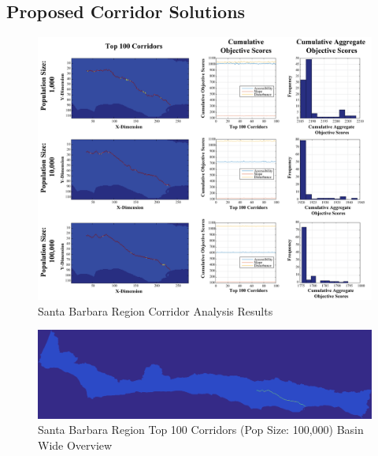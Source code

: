     \subsection{Proposed Corridor Solutions}
    
        \begin{figure}[!h]
            \begin{center}
            \includegraphics[width=6in]{figures/SantaBarbara_PathwayResults.png}   
            \caption{Santa Barbara Region Corridor Analysis Results}
            \label{fig:SBresults}
            \end{center}
        \end{figure}

        \begin{figure}[!h]
            \begin{center}
            \includegraphics[width=5.5in]{figures/SantaBarbara_PathwayLarge.png}   
            \caption{Santa Barbara Region Top 100 Corridors (Pop Size: 100,000) Basin Wide Overview}
            \label{fig:SBsolutionOverview}
            \end{center}
        \end{figure}
        

